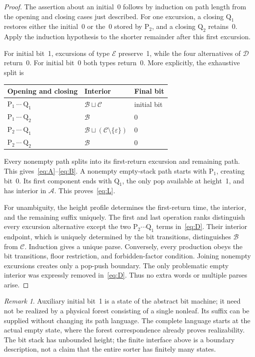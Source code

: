 \documentclass[11pt,a4paper]{article}
\theoremstyle{remark}
\newtheorem{remark}[theorem]{Remark}
\newcommand{\eps}{\varepsilon}
\newcommand{\PP}{\mathrm{P}}
\newcommand{\QQ}{\mathrm{Q}}
\newcommand{\Lang}[1]{\mathcal{#1}}
\begin{document}
\begin{proof}
The assertion about an initial~0 follows by induction on path length
from the opening and closing cases just described. For one excursion,
a closing $\QQ_1$ restores either the initial~0 or the~0 stored by
$\PP_2$, and a closing $\QQ_2$ retains~0. Apply the induction hypothesis
to the shorter remainder after this first excursion.

For initial bit~1, excursions of type $\Lang E$ preserve~1, while the
four alternatives of $\Lang D$ return~0. For initial bit~0 both types
return~0. More explicitly, the exhaustive split is
\begin{center}
\begin{tabular}{lll}
\toprule
Opening and closing & Interior & Final bit\\
\midrule
$\PP_1\ \cdots\ \QQ_1$ & $\Lang B\sqcup\Lang C$ & initial bit\\
$\PP_1\ \cdots\ \QQ_2$ & $\Lang B$ & $0$\\
$\PP_2\ \cdots\ \QQ_1$ & $\Lang B\sqcup(\Lang C\setminus\{\eps\})$ & $0$\\
$\PP_2\ \cdots\ \QQ_2$ & $\Lang B$ & $0$\\
\bottomrule
\end{tabular}
\end{center}
Every nonempty path splits into its first-return excursion and remaining
path. This gives~\eqref{eq:A}--\eqref{eq:B}. A nonempty empty-stack path
starts with $\PP_1$, creating bit~0. Its first component ends with
$\QQ_1$, the only pop available at height~1, and has interior in
$\Lang A$. This proves~\eqref{eq:L}.

For unambiguity, the height profile determines the first-return time,
the interior, and the remaining suffix uniquely. The first and last
operation ranks distinguish every excursion alternative except the two
$\PP_2\cdots\QQ_1$ terms in~\eqref{eq:D}. Their interior endpoint,
which is uniquely determined by the bit transitions, distinguishes
$\Lang B$ from $\Lang C$. Induction gives a unique parse.
Conversely, every production obeys the bit transitions, floor restriction,
and forbidden-factor condition. Joining nonempty excursions creates only
a pop-push boundary. The only problematic empty interior was expressly
removed in~\eqref{eq:D}. Thus no extra words or multiple parses arise.
\end{proof}

\begin{remark}
Auxiliary initial bit~1 is a state of the abstract bit machine; it need
not be realized by a physical forest consisting of a single nonleaf.
Its suffix can be supplied without changing its path language. The
complete language starts at the actual empty state, where the forest
correspondence already proves realizability. The bit stack has unbounded
height; the finite interface above is a boundary description, not a
claim that the entire sorter has finitely many states.
\end{remark}
\end{document}

